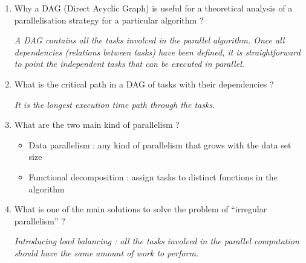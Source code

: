 \documentclass[11pt,a4paper]{article}
\begin{document}
\begin{exercise}[Vocabulary]
  $~$ %
\begin{enumerate}[label=(\alph*)]
	\item Why a DAG (Direct Acyclic Graph) is useful for a theoretical analysis of a parallelisation strategy for a particular algorithm ?

{\it	A DAG contains all the tasks involved in the parallel algorithm. Once all dependencies (relations between tasks) have been defined, it is straightforward to point the independent tasks that can be executed in parallel.  
}
	\item What is the critical path in a DAG of tasks with their dependencies ?

{\it
	It is the longest execution time path through the tasks. 
}

	\item What are the two main kind of parallelism  ?

{\it

	\begin{itemize}
		\item {Data parallelism : any kind of parallelism that grows with the data set size}
		\item {Functional decomposition : assign tasks to distinct functions in the algorithm}
	\end{itemize}
}

	\item What is one of the main solutions to solve the problem of ``irregular parallelism'' ?

{\it
	Introducing load balancing : all the tasks involved in the parallel computation should have the same amount of work to perform.  
}
\end{enumerate}
\end{exercise}
\end{document}
